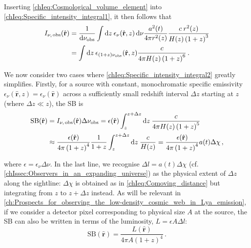 Inserting \cref{chIeq:Cosmological_volume_element} into \cref{chIeq:Specific_intensity_integral1}, it then follows that
\begin{align}
    \label{chIeq:Specific_intensity_integral2}
    I_{\nu, \, \text{obs}} (\hat{\mathbf{r}}) & = \frac{1}{\dif \nu_\text{obs}} \int \dif z \: \epsilon_\nu (\hat{\mathbf{r}}, z) \dif \nu \frac{a^2(t)}{4 \pi r^2(z)} \frac{c \: r^2(z)}{H(z) \left( 1 + z \right)^3} \nonumber
    \\
    & = \int \dif z \: \epsilon_{(1 + z) \nu_\text{obs}} (\hat{\mathbf{r}}, z) \frac{c}{4 \pi H(z) \left( 1 + z \right)^6} \, .
\end{align}

We now consider two cases where \cref{chIeq:Specific_intensity_integral2} greatly simplifies. Firstly, for a source with constant, monochromatic specific emissivity $\epsilon_\nu (\hat{\mathbf{r}}, z) = \epsilon_\nu (\hat{\mathbf{r}})$ across a sufficiently small redshift interval $\Delta z$ starting at $z$ (where $\Delta z \ll z$), the SB is
\begin{align}
    \label{chIeq:Surface_brightness1}
    \text{SB} (\hat{\mathbf{r}}) & = I_{\nu, \, \text{obs}} (\hat{\mathbf{r}}) \Delta \nu_\text{obs} = \epsilon (\hat{\mathbf{r}}) \int_z^{z+\Delta z} \dif z \: \frac{c}{4 \pi H(z) \left( 1 + z \right)^5}
    \\
    & \approx \frac{\epsilon (\hat{\mathbf{r}})}{4 \pi \left( 1 + z \right)^4} \frac{1}{1 + z} \int_z^{z+\Delta z} \dif z \: \frac{c}{H(z)} = \frac{\epsilon (\hat{\mathbf{r}})}{4 \pi \left( 1 + z \right)^4} a(t) \Delta \chi \, ,
\end{align}

\noindent where $\epsilon = \epsilon_\nu \Delta \nu$. In the last line, we recognise $\Delta l = a(t) \Delta \chi$ (cf. \cref{chIssec:Observers_in_an_expanding_universe}) as the physical extent of $\Delta z$ along the sightline: $\Delta \chi$ is obtained as in \cref{chIeq:Comoving_distance} but integrating from $z$ to $z + \Delta z$ instead. As will be relevant in \cref{ch:Prospects_for_observing_the_low-density_cosmic_web_in_Lya_emission}, if we consider a detector pixel corresponding to physical size $A$ at the source, the SB can also be written in terms of the luminosity, $L = \epsilon A \Delta l$:
\begin{equation}
    \label{chIeq:Surface_brightness2}
    \text{SB} (\hat{\mathbf{r}}) = \frac{L (\hat{\mathbf{r}})}{4 \pi A \left( 1 + z \right)^4} \, .
\end{equation}

